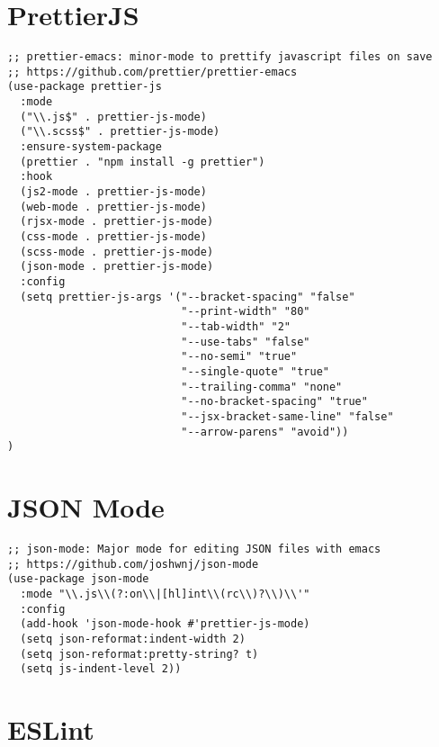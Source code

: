 \documentclass[11pt]{article}
\begin{document}
\section*{PrettierJS}
\label{sec:orgb13ed77}

\begin{verbatim}
;; prettier-emacs: minor-mode to prettify javascript files on save
;; https://github.com/prettier/prettier-emacs
(use-package prettier-js
  :mode
  ("\\.js$" . prettier-js-mode)
  ("\\.scss$" . prettier-js-mode)
  :ensure-system-package
  (prettier . "npm install -g prettier")
  :hook
  (js2-mode . prettier-js-mode)
  (web-mode . prettier-js-mode)
  (rjsx-mode . prettier-js-mode)
  (css-mode . prettier-js-mode)
  (scss-mode . prettier-js-mode)
  (json-mode . prettier-js-mode)
  :config
  (setq prettier-js-args '("--bracket-spacing" "false"
                           "--print-width" "80"
                           "--tab-width" "2"
                           "--use-tabs" "false"
                           "--no-semi" "true"
                           "--single-quote" "true"
                           "--trailing-comma" "none"
                           "--no-bracket-spacing" "true"
                           "--jsx-bracket-same-line" "false"
                           "--arrow-parens" "avoid"))
)
\end{verbatim}


\section*{JSON Mode}
\label{sec:orgd8b6ed6}

\begin{verbatim}
;; json-mode: Major mode for editing JSON files with emacs
;; https://github.com/joshwnj/json-mode
(use-package json-mode
  :mode "\\.js\\(?:on\\|[hl]int\\(rc\\)?\\)\\'"
  :config
  (add-hook 'json-mode-hook #'prettier-js-mode)
  (setq json-reformat:indent-width 2)
  (setq json-reformat:pretty-string? t)
  (setq js-indent-level 2))
\end{verbatim}

\section*{ESLint}
\label{sec:orga0aa868}
\end{document}
